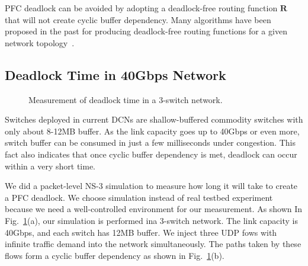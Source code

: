 PFC deadlock can be avoided by adopting a deadlock-free routing function $\textbf{R}$ that will not create cyclic buffer dependency. Many algorithms have been proposed in the past for producing deadlock-free routing functions for a given network topology~\cite{dally,flich2012survey,tcpbolt}.

%

\subsection{Deadlock Time in 40Gbps Network}\label{subsec:deadlocktime}

\begin{figure}[t]
	\centering
	\caption{Measurement of deadlock time in a 3-switch network.}\label{fig:deadlocktime}
	
\end{figure}

Switches deployed in current DCNs are shallow-buffered commodity switches with only about 8-12MB buffer. As the link capacity goes up to 40Gbps or even more,  switch buffer can be consumed in just a few milliseconds under congestion. This fact also indicates that once cyclic buffer dependency is met, deadlock can occur within a very short time.

We did a packet-level NS-3 simulation to measure how long it will take to create a PFC deadlock. We choose simulation instead of real testbed experiment because we need a well-controlled environment for our measurement. 
As shown In Fig.~\ref{fig:deadlocktime}(a), our simulation is performed ina 3-switch network. The link capacity is 40Gbps, and each switch has 12MB buffer. We inject three UDP fows with infinite traffic demand into the network simultaneously. The paths taken by these flows form a cyclic buffer dependency as shown in Fig.~\ref{fig:deadlocktime}(b).

